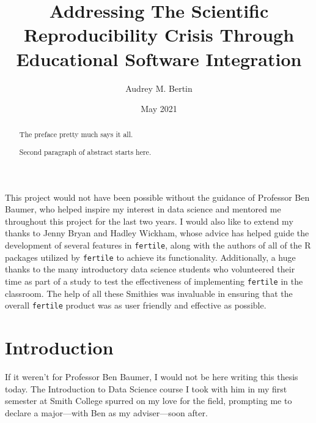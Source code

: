 \documentclass[12pt,twoside]{reedthesis}
\title{Addressing The Scientific Reproducibility Crisis Through Educational Software Integration}
\author{Audrey M. Bertin}
\date{May 2021}
\begin{document}
  \maketitle

\frontmatter %
\pagestyle{empty} %
  \begin{acknowledgements}
    This project would not have been possible without the guidance of Professor Ben Baumer, who helped inspire my interest in data science and mentored me throughout this project for the last two years.
    I would also like to extend my thanks to Jenny Bryan and Hadley Wickham, whose advice has helped guide the development of several features in \texttt{fertile}, along with the authors of all of the R packages utilized by \texttt{fertile} to achieve its functionality.
    Additionally, a huge thanks to the many introductory data science students who volunteered their time as part of a study to test the effectiveness of implementing \texttt{fertile} in the classroom. The help of all these Smithies was invaluable in ensuring that the overall \texttt{fertile} product was as user friendly and effective as possible.
  \end{acknowledgements}

  \hypersetup{linkcolor=black}
  \setcounter{tocdepth}{2}
  \tableofcontents


  \listoffigures
  \begin{abstract}
    The preface pretty much says it all.
    
    \par
    
    Second paragraph of abstract starts here.
  \end{abstract}

\mainmatter %
\pagestyle{fancyplain} %

\hypertarget{introduction}{%
\chapter*{Introduction}\label{introduction}}

If it weren't for Professor Ben Baumer, I would not be here writing this thesis today. The Introduction to Data Science course I took with him in my first semester at Smith College spurred on my love for the field, prompting me to declare a major---with Ben as my adviser---soon after.
\end{document}
